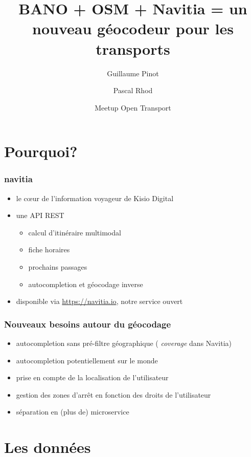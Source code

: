 \documentclass[table]{beamer}
\title[BANO + OSM + Navitia]{BANO + OSM + Navitia = un nouveau géocodeur pour les transports}
\author{Guillaume Pinot \and Pascal Rhod}
\institute[Kisio Digital] %
{
  Kisio Digital\\
  20 rue Hector Malot\\
  75012 Paris, France}
\date{Meetup Open Transport}
\newcommand*{\foreign}[2][english]{%
    \emph{\foreignlanguage{#1}{#2}}%
}
\begin{document}
\begin{frame}
  \titlepage
\end{frame}

\section{Pourquoi?}

\begin{frame}
  \frametitle{navitia}

  \begin{itemize}
  \item le cœur de l'information voyageur de Kisio Digital
  \item une API REST
    \begin{itemize}
    \item calcul d'itinéraire multimodal
    \item fiche horaires
    \item prochains passages
    \item autocompletion et géocodage inverse
    \end{itemize}
  \item disponible via \url{https://navitia.io}, notre service ouvert
  \end{itemize}
\end{frame}

\begin{frame}
  \frametitle{Nouveaux besoins autour du géocodage}

  \begin{itemize}
  \item autocompletion sans pré-filtre géographique (\foreign{coverage} dans Navitia)
  \item autocompletion potentiellement sur le monde
  \item prise en compte de la localisation de l'utilisateur
  \item gestion des zones d'arrêt en fonction des droits de l'utilisateur
  \item séparation en (plus de) microservice
  \end{itemize}
\end{frame}

\section{Les données}
\end{document}
